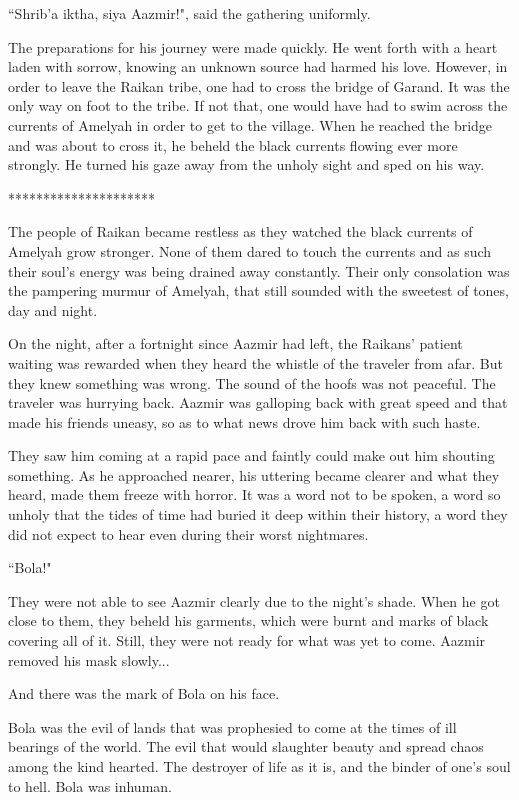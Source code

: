 \documentclass[twoside,11pt,titlepage]{article}
\begin{document}
``Shrib'a iktha, siya Aazmir!", said the gathering uniformly.

The preparations for his journey were made quickly. He went forth with a heart laden with sorrow, knowing an unknown source had harmed his love. However, in order to leave the Raikan tribe, one had to cross the bridge of Garand. It was the only way on foot to the tribe. If not that, one would have had to swim across the currents of Amelyah in order to get to the village. When he reached the bridge and was about to cross it, he beheld the black currents flowing ever more strongly. He turned his gaze away from the unholy sight and sped on his way.

\bigskip
\begin{center}
*********************
\end{center}

The people of Raikan became restless as they watched the black currents of Amelyah grow stronger. None of them dared to touch the currents and as such their soul’s energy was being drained away constantly. Their only consolation was the pampering murmur of Amelyah, that still sounded with the sweetest of tones, day and night.

On the night, after a fortnight since Aazmir had left, the Raikans' patient waiting was rewarded when they heard the whistle of the traveler from afar. But they knew something was wrong. The sound of the hoofs was not peaceful. The traveler was hurrying back. Aazmir was galloping back with great speed and that made his friends uneasy, so as to what news drove him back with such haste.

They saw him coming at a rapid pace and faintly could make out him shouting something. As he approached nearer, his uttering became clearer and what they heard, made them freeze with horror. It was a word not to be spoken, a word so unholy that the tides of time had buried it deep within their history, a word they did not expect to hear even during their worst nightmares.

``Bola!"

They were not able to see Aazmir clearly due to the night's shade. When he got close to them, they beheld his garments, which were burnt and marks of black covering all of it. Still, they were not ready for what was yet to come. Aazmir removed his mask slowly...

And there was the mark of Bola on his face.

Bola was the evil of lands that was prophesied to come at the times of ill bearings of the world. The evil that would slaughter beauty and spread chaos among the kind hearted. The destroyer of life as it is, and the binder of one's soul to hell. Bola was inhuman.
\end{document}
